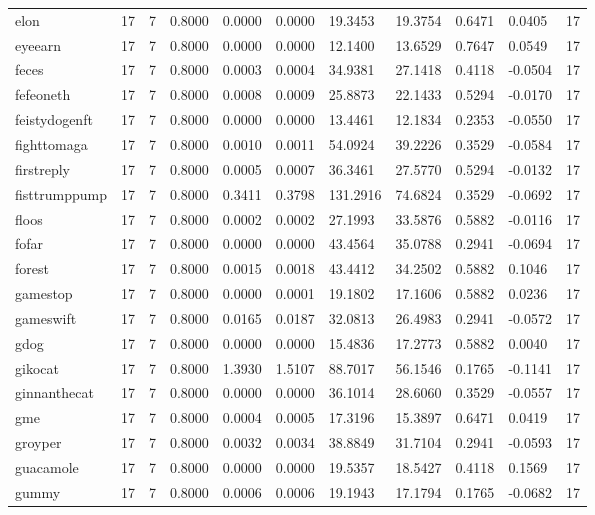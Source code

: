 \begin{table}[htbp]
\begin{tabular}{lllllllllll}
elon & 17 & 7 & 0.8000 & 0.0000 & 0.0000 & 19.3453 & 19.3754 & 0.6471 & 0.0405 & 17 \\
eyeearn & 17 & 7 & 0.8000 & 0.0000 & 0.0000 & 12.1400 & 13.6529 & 0.7647 & 0.0549 & 17 \\
feces & 17 & 7 & 0.8000 & 0.0003 & 0.0004 & 34.9381 & 27.1418 & 0.4118 & -0.0504 & 17 \\
fefeoneth & 17 & 7 & 0.8000 & 0.0008 & 0.0009 & 25.8873 & 22.1433 & 0.5294 & -0.0170 & 17 \\
feistydogenft & 17 & 7 & 0.8000 & 0.0000 & 0.0000 & 13.4461 & 12.1834 & 0.2353 & -0.0550 & 17 \\
fighttomaga & 17 & 7 & 0.8000 & 0.0010 & 0.0011 & 54.0924 & 39.2226 & 0.3529 & -0.0584 & 17 \\
firstreply & 17 & 7 & 0.8000 & 0.0005 & 0.0007 & 36.3461 & 27.5770 & 0.5294 & -0.0132 & 17 \\
fisttrumppump & 17 & 7 & 0.8000 & 0.3411 & 0.3798 & 131.2916 & 74.6824 & 0.3529 & -0.0692 & 17 \\
floos & 17 & 7 & 0.8000 & 0.0002 & 0.0002 & 27.1993 & 33.5876 & 0.5882 & -0.0116 & 17 \\
fofar & 17 & 7 & 0.8000 & 0.0000 & 0.0000 & 43.4564 & 35.0788 & 0.2941 & -0.0694 & 17 \\
forest & 17 & 7 & 0.8000 & 0.0015 & 0.0018 & 43.4412 & 34.2502 & 0.5882 & 0.1046 & 17 \\
gamestop & 17 & 7 & 0.8000 & 0.0000 & 0.0001 & 19.1802 & 17.1606 & 0.5882 & 0.0236 & 17 \\
gameswift & 17 & 7 & 0.8000 & 0.0165 & 0.0187 & 32.0813 & 26.4983 & 0.2941 & -0.0572 & 17 \\
gdog & 17 & 7 & 0.8000 & 0.0000 & 0.0000 & 15.4836 & 17.2773 & 0.5882 & 0.0040 & 17 \\
gikocat & 17 & 7 & 0.8000 & 1.3930 & 1.5107 & 88.7017 & 56.1546 & 0.1765 & -0.1141 & 17 \\
ginnanthecat & 17 & 7 & 0.8000 & 0.0000 & 0.0000 & 36.1014 & 28.6060 & 0.3529 & -0.0557 & 17 \\
gme & 17 & 7 & 0.8000 & 0.0004 & 0.0005 & 17.3196 & 15.3897 & 0.6471 & 0.0419 & 17 \\
groyper & 17 & 7 & 0.8000 & 0.0032 & 0.0034 & 38.8849 & 31.7104 & 0.2941 & -0.0593 & 17 \\
guacamole & 17 & 7 & 0.8000 & 0.0000 & 0.0000 & 19.5357 & 18.5427 & 0.4118 & 0.1569 & 17 \\
gummy & 17 & 7 & 0.8000 & 0.0006 & 0.0006 & 19.1943 & 17.1794 & 0.1765 & -0.0682 & 17 \\

\end{tabular}
\end{table}
